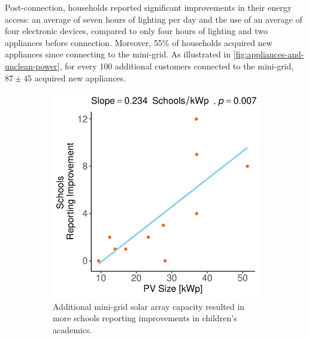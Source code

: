 Post-connection, households reported significant improvements in their energy access: an average of seven hours of lighting per day and the use of an average of four electronic devices, compared to only four hours of lighting and two appliances before connection. Moreover, 55\% of households acquired new appliances since connecting to the mini-grid. As illustrated in \cref{fig:appliances-and-unclean-power}, for every 100 additional customers connected to the mini-grid, $87\pm45$ acquired new appliances.

\begin{figure}[th]
    \centering
    \begin{subfigure}[t]{0.48\textwidth}
        \centering
        \includegraphics[width=\textwidth]{images/school_performance_regression_community.pdf}
        \caption{Additional mini-grid solar array capacity resulted in more schools reporting improvements in children's academics.}
        \label{fig:academics_schools}
    \end{subfigure}
    \hfill
    \begin{subfigure}[t]{0.48\textwidth}
        \centering

\end{subfigure}
\end{figure}
